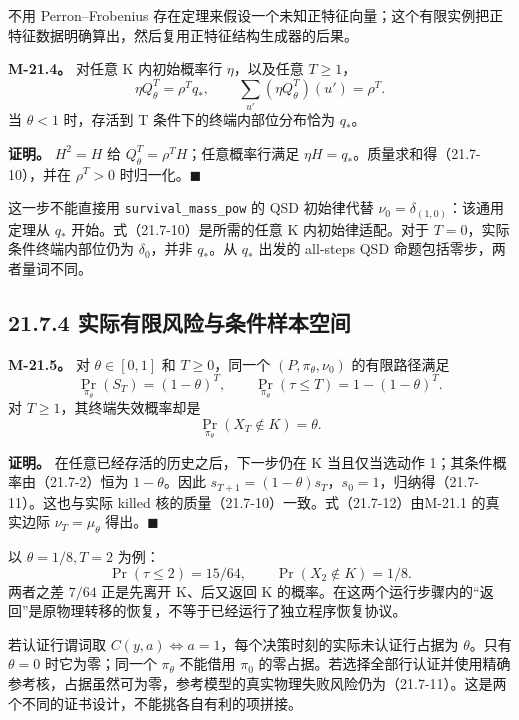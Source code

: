 \documentclass[
  11pt,
  oneside]{book}
\begin{document}
不用 Perron--Frobenius 存在定理来假设一个未知正特征向量；这个有限实例把正特征数据明确算出，然后复用正特征结构生成器的后果。

\hypertarget{m-21-4}{}\label{m-21-4}

\textbf{M-21.4。} 对任意 K 内初始概率行 \(\eta\)，以及任意 \(T\ge1\)， \[\eta Q_\theta^T=\rho^Tq_*,\qquad
\sum_{u'}(\eta Q_\theta^T)(u')=\rho^T.                \tag{21.7-10}\] 当 \(\theta<1\) 时，存活到 T 条件下的终端内部位分布恰为 \(q_*\)。

\textbf{证明。} \(H^2=H\) 给 \(Q_\theta^T=\rho^TH\)；任意概率行满足 \(\eta H=q_*\)。质量求和得（21.7-10），并在 \(\rho^T>0\) 时归一化。\(\blacksquare\)

这一步不能直接用 \nolinkurl{survival_mass_pow} 的 QSD 初始律代替 \(\nu_0=\delta_{(1,0)}\)：该通用定理从 \(q_*\) 开始。式（21.7-10）是所需的任意 K 内初始律适配。对于 \(T=0\)，实际条件终端内部位仍为 \(\delta_0\)，并非 \(q_*\)。从 \(q_*\) 出发的 all-steps QSD 命题包括零步，两者量词不同。

\subsection{21.7.4 实际有限风险与条件样本空间}\label{ux5b9eux9645ux6709ux9650ux98ceux9669ux4e0eux6761ux4ef6ux6837ux672cux7a7aux95f4}

\hypertarget{m-21-5}{}\label{m-21-5}

\textbf{M-21.5。} 对 \(\theta\in[0,1]\) 和 \(T\ge0\)，同一个 \((P,\pi_\theta,\nu_0)\) 的有限路径满足 \[\Pr_{\pi_\theta}(S_T)=(1-\theta)^T,\qquad
\Pr_{\pi_\theta}(\tau\le T)=1-(1-\theta)^T.           \tag{21.7-11}\] 对 \(T\ge1\)，其终端失效概率却是 \[\Pr_{\pi_\theta}(X_T\notin K)=\theta.                \tag{21.7-12}\]

\textbf{证明。} 在任意已经存活的历史之后，下一步仍在 K 当且仅当选动作 1；其条件概率由（21.7-2）恒为 \(1-\theta\)。因此 \(s_{T+1}=(1-\theta)s_T\)，\(s_0=1\)，归纳得（21.7-11）。这也与实际 killed 核的质量（21.7-10）一致。式（21.7-12）由M-21.1 的真实边际 \(\nu_T=\mu_\theta\) 得出。\(\blacksquare\)

以 \(\theta=1/8,T=2\) 为例： \[\Pr(\tau\le2)=15/64,\qquad \Pr(X_2\notin K)=1/8.\] 两者之差 \(7/64\) 正是先离开 K、后又返回 K 的概率。在这两个运行步骤内的``返回''是原物理转移的恢复，不等于已经运行了独立程序恢复协议。

若认证行谓词取 \(C(y,a)\iff a=1\)，每个决策时刻的实际未认证行占据为 \(\theta\)。只有 \(\theta=0\) 时它为零；同一个 \(\pi_\theta\) 不能借用 \(\pi_0\) 的零占据。若选择全部行认证并使用精确参考核，占据虽然可为零，参考模型的真实物理失败风险仍为（21.7-11）。这是两个不同的证书设计，不能挑各自有利的项拼接。
\end{document}
